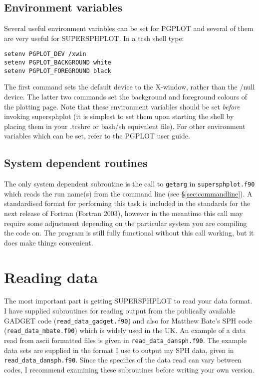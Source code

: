 \documentclass[a4paper,12pt]{article}
\begin{document}
\subsection{Environment variables}
 Several useful environment variables can be set for PGPLOT and several of them
are very useful for SUPERSPHPLOT. In a tcsh shell type:
\begin{verbatim}
setenv PGPLOT_DEV /xwin
setenv PGPLOT_BACKGROUND white
setenv PGPLOT_FOREGROUND black
\end{verbatim}
The first command sets the default device to the X-window, rather than the /null
device. The latter two commands set the background and foreground colours of the
plotting page. Note that these environment variables should be set \emph{before}
invoking supersphplot (it is simplest to set them upon starting the shell by placing
them in your .tcshrc or bash/sh equivalent file). For other environment
variables which can be set, refer to the PGPLOT user guide.

\subsection{System dependent routines}
The only system dependent subroutine is the call to \verb+getarg+ in
\verb+supersphplot.f90+ which
reads the run name(s) from the command line (see \S\vref{sec:commandline}). A standardised format for performing this
task is included in the standards for the next release of Fortran (Fortran 2003),
however in the meantime this call may require some adjustment depending on the
particular system you are compiling the code on. The program is still fully
functional without this call working, but it does make things convenient.

\section{Reading data}
 The most important part is getting SUPERSPHPLOT to read your data format. I
have supplied subroutines for reading output from the publically available
GADGET code (\verb+read_data_gadget.f90+) and also for Matthew Bate's SPH code
(\verb+read_data_mbate.f90+) which is widely used in the UK. An example of a
data read from ascii formatted files is given in \verb+read_data_dansph.f90+.
The example data sets are supplied in the format I use to output my SPH data,
given in \verb+read_data_dansph.f90+. Since the specifics of the data read can
vary between codes, I recommend examining these subroutines before writing your
own version.
\end{document}
